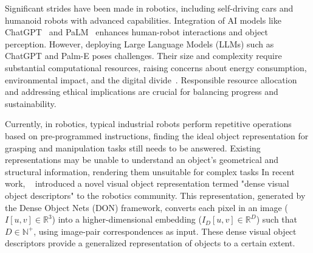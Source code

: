 
Significant strides have been made in robotics, including self-driving cars and humanoid robots with advanced capabilities.
Integration of AI models like ChatGPT~\cite{openai2023gpt4} and PaLM~\cite{palm}
enhances human-robot interactions and object perception. However, deploying Large Language Models (LLMs)
such as ChatGPT and Palm-E poses challenges.
Their size and complexity require substantial computational resources,
raising concerns about energy consumption, environmental impact,
and the digital divide~\cite{bender2021dangers,strubell2019energy}.
Responsible resource allocation and addressing ethical implications are crucial for balancing progress and sustainability.

Currently, in robotics, typical industrial robots perform repetitive operations based on pre-programmed instructions,
finding the ideal object representation for grasping and manipulation tasks still needs to be answered.
Existing representations may be unable to understand an object's geometrical and structural information, rendering them unsuitable for complex tasks
In recent work, \citeauthor{florence2018dense}~\cite{florence2018dense} introduced a novel visual object representation termed "dense visual object descriptors" to the robotics community.
This representation, generated by the Dense Object Nets (DON) framework, converts each pixel in an image ($I[u, v] \in \mathbb{R}^3$)
into a higher-dimensional embedding ($I_D[u, v] \in \mathbb{R}^D$) such that $D \in \mathbb{N}^+$,
using image-pair correspondences as input. These dense visual object descriptors provide a generalized representation of objects to a certain extent.


